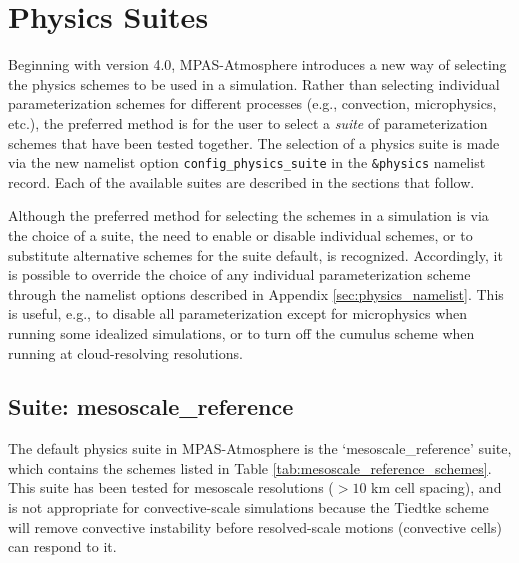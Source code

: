 \chapter{Physics Suites}
\label{chap:phys_suites}

Beginning with version 4.0, MPAS-Atmosphere introduces a new way of selecting the physics schemes to be used in a simulation. Rather than selecting individual parameterization schemes for different processes (e.g., convection, microphysics, etc.), the preferred method is for the user to select a {\em suite} of parameterization schemes that have been tested together. The selection of a physics suite is made via the new namelist option {\tt config\_physics\_suite} in the {\tt \&physics} namelist record. Each of the available suites are described in the sections that follow.

Although the preferred method for selecting the schemes in a simulation is via the choice of a suite, the need to enable or disable individual schemes, or to substitute alternative schemes for the suite default, is recognized. Accordingly, it is possible to override the choice of any individual parameterization scheme through the namelist options described in Appendix \ref{sec:physics_namelist}. This is useful, e.g., to disable all parameterization except for microphysics when running some idealized simulations, or to turn off the cumulus scheme when running at cloud-resolving resolutions.

\section{Suite: mesoscale\_reference}
\label{sec:phys_mesoscale_reference} 

The default physics suite in MPAS-Atmosphere is the `mesoscale\_reference' suite, which contains the schemes listed in Table \ref{tab:mesoscale_reference_schemes}. This suite has been tested for mesoscale resolutions ($>10$ km cell spacing), and is not appropriate for convective-scale simulations because the Tiedtke scheme will remove convective instability before resolved-scale motions (convective cells) can respond to it.

